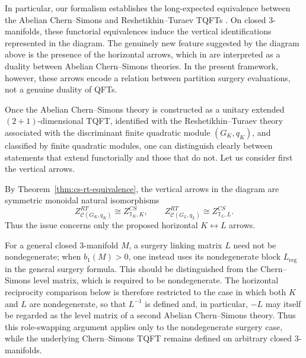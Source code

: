 \documentclass[12pt]{amsart}
\numberwithin{equation}{section}
\theoremstyle{definition}
\begin{document}
In particular, our formalism establishes the long-expected equivalence between the Abelian Chern--Simons and Reshetikhin--Turaev TQFTs \cite{Galviz1,Galviz3}. On closed $3$-manifolds, these functorial equivalences induce the vertical identifications represented in the diagram. The genuinely new feature suggested by the diagram above is the presence of the horizontal arrows, which in \cite{Kim2024,Tagaris2025} are interpreted as a duality between Abelian Chern--Simons theories. In the present framework, however, these arrows encode a relation between partition surgery evaluations, not a genuine duality of QFTs. 

Once the Abelian Chern--Simons theory is constructed as a unitary extended $(2+1)$-dimensional TQFT, identified with the Reshetikhin--Turaev theory associated with the discriminant finite quadratic module $(G_K,q_K)$, and classified by finite quadratic modules, one can distinguish clearly between statements that extend functorially and those that do not. Let us consider first the vertical arrows. 

By Theorem~\ref{thm:cs-rt-equivalence}, the vertical arrows in the diagram are symmetric monoidal natural isomorphisms
$$
Z^{RT}_{\mathcal C(G_K,q_K)}\cong Z^{CS}_{\mathbb T_K,K},
\qquad
Z^{RT}_{\mathcal C(G_L,q_L)}\cong Z^{CS}_{\mathbb T_L,L}.
$$
Thus the issue concerns only the proposed horizontal $K\leftrightarrow L$ arrows.

For a general closed $3$-manifold $M$, a surgery linking matrix $L$ need not be nondegenerate; when $b_1(M)>0$, one instead uses its nondegenerate block $L_{\mathrm{reg}}$ in the general surgery formula. This should be distinguished from the Chern--Simons level matrix, which is required to be nondegenerate. The horizontal reciprocity comparison below is therefore restricted to the case in which both $K$ and $L$ are nondegenerate, so that $L^{-1}$ is defined and, in particular, $-L$ may itself be regarded as the level matrix of a second Abelian Chern--Simons theory. Thus this role-swapping argument applies only to the nondegenerate surgery case, while the underlying Chern--Simons TQFT remains defined on arbitrary closed $3$-manifolds.
\end{document}
